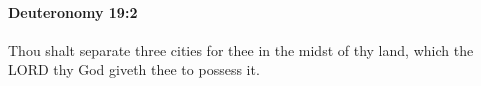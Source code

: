 
		\paragraph{Deuteronomy 19:2} %
			\label{DEUTERONOMY-19-2}

			Thou shalt separate three cities for thee in the midst of thy land, which the LORD thy God giveth thee to possess it.


